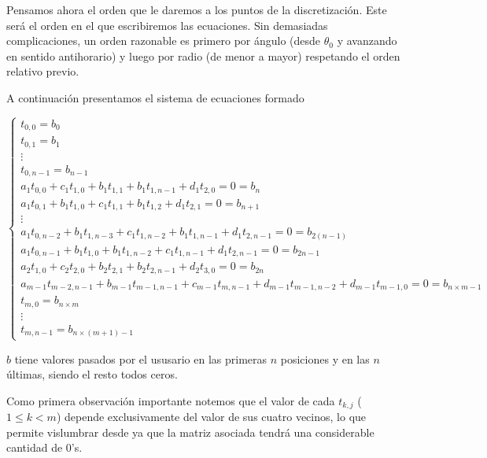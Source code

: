 Pensamos ahora el orden que le daremos a los puntos de la discretización. Este será el orden en el que escribiremos las ecuaciones. Sin demasiadas complicaciones, un orden razonable es primero por ángulo (desde $\theta_0$ y avanzando en sentido antihorario) y luego por radio (de menor a mayor) respetando el orden relativo previo.

A continuación presentamos el sistema de ecuaciones formado 

\begin{equation}
\label{eq:sisecu}
  \left\lbrace
  \begin{array}{l}
     t_{0,0} = b_0 \\
     t_{0,1} = b_1 \\
     \vdots\\
     t_{0,n-1} = b_{n-1} \\
		 a_1 t_{0,0} + c_1 t_{1,0} + b_1 t_{1, 1} + b_1 t_{1, n-1} + d_1 t_{2, 0} = 0 = b_{n}\\
		 a_1 t_{0,1} + b_1 t_{1, 0} + c_1 t_{1,1} + b_1 t_{1,2} + d_1 t_{2,1} = 0 = b_{n+1} \\
		 \vdots\\
		 a_1 t_{0,n-2} + b_1 t_{1, n-3} + c_1 t_{1,n-2} + b_1 t_{1,n-1} + d_1 t_{2,n-1} = 0 = b_{2(n-1)} \\
		 a_1 t_{0,n-1} + b_1 t_{1, 0} + b_1 t_{1, n-2} + c_1 t_{1,n-1} + d_1 t_{2, n-1} = 0= b_{2n - 1}\\
		 a_2 t_{1,0} + c_2 t_{2,0} + b_2 t_{2, 1} + b_2 t_{2, n-1}  + d_2 t_{3, 0} = 0 = b_{2n}\\

		 a_{m-1} t_{m-2,n-1} + b_{m-1} t_{m-1,n-1} + c_{m-1} t_{m, n-1} + d_{m-1} t_{m-1, n-2} + d_{m-1} t_{m-1, 0} = 0 = b_{n\times m -1}\\
		 t_{m,0} = b_{n\times m}\\
		 \vdots\\
		 t_{m, n-1} = b_{n\times (m+1)-1}
		 
  \end{array}
  \right.
\end{equation}

$b$ tiene valores pasados por el ususario en las primeras $n$ posiciones y en las $n$ últimas, siendo el resto todos ceros.

Como primera observación importante notemos que el valor de cada $t_{k,j}$ ($1\leq k < m$) depende exclusivamente del valor de sus cuatro vecinos, lo que permite vislumbrar desde ya que la matriz asociada tendrá una considerable cantidad de 0's.

